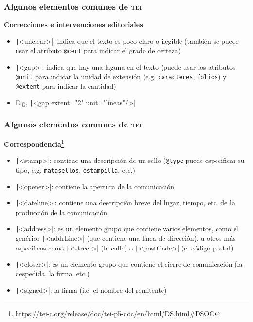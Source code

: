 \documentclass[%
  handout, %
  ]{beamer}
\newcommand*{\azul}[1]{\textcolor{bluenivaca}{#1}}
\newcommand*{\TEI}{\textsc{tei}}
\begin{document}
\begin{frame}
  \frametitle{Algunos elementos comunes de \TEI}

  \textbf{\azul{Correcciones e intervenciones editoriales}}

  \smallskip

  \begin{itemize}
      
    \item \texttt|<unclear>|: indica que el texto es poco claro o ilegible (también se puede usar el atributo \texttt{@cert} para indicar el grado de certeza)
    \item \texttt|<gap>|: indica que hay una laguna en el texto (puede usar los atributos \texttt{@unit} para indicar la unidad de extensión (e.g. \texttt{caracteres}, \texttt{folios}) y \texttt{@extent} para indicar la cantidad)
    \item[] E.g. \texttt|<gap extent="2" unit="líneas"/>|
  \end{itemize}
\end{frame}



\begin{frame}
  \frametitle{Algunos elementos comunes de \TEI}

  \textbf{\azul{Correspondencia}}\footnote{\url{https://tei-c.org/release/doc/tei-p5-doc/en/html/DS.html\#DSOC}}

  \smallskip

  \begin{itemize}
    \item \texttt|<stamp>|: contiene una descripción de un sello (\texttt{@type} puede especificar su tipo, e.g. \texttt{matasellos}, \texttt{estampilla}, etc.) 
    \item \texttt|<opener>|: contiene la apertura de la comunicación
    \item \texttt|<dateline>|: contiene una descripción breve del lugar, tiempo, etc. de la producción de la comunicación
    \item \texttt|<address>|: es un elemento grupo que contiene  varios elementos, como el genérico \texttt|<addrLine>| (que contiene una línea de dirección), u otros más específicos como \texttt|<street>| (la calle) o \texttt|<postCode>| (el código postal) 
    \item \texttt|<closer>|: es un elemento grupo que contiene el cierre de comunicación (la despedida, la firma, etc.) 
    \item \texttt|<signed>|: la firma (i.e. el nombre del remitente) 
  \end{itemize}

  
\end{frame}
\end{document}
